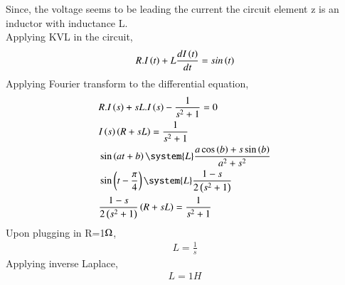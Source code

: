 \documentclass[journal,12pt,twocolumn]{IEEEtran}
\theoremstyle{remark}
\begin{document}
Since, the voltage seems to be leading the current the circuit element z is an inductor with inductance L.\\
Applying KVL in the circuit,
\begin{align}
    R.I\left(t\right)+L\frac{dI\left(t\right)}{dt}=sin\left(t\right)
\end{align}
Applying Fourier transform to the differential equation,
\begin{align}
    &R.I\brak{s}+sL.I\brak{s}-\frac{1}{s^2+1}=0\\
    &I\brak{s}\brak{R+sL}=\frac{1}{s^2+1}\\
    &\sin\brak{at+b}\system{L}\frac{a\cos\brak{b}+s\sin\brak{b}}{a^{2}+s^{2}}\\
    &\sin\brak{t-\frac{\pi}{4}}\system{L}\frac{1-s}{2\brak{s^2+1}}\\
    &\frac{1-s}{2\brak{s^2+1}}\brak{R+sL}=\frac{1}{s^2+1}
\end{align}
Upon plugging in R=1$\ohm$,
\begin{align}
   L=\frac{1}{s}
\end{align}
Applying inverse Laplace,
\begin{align}
    L=1H
\end{align}
\end{document}

